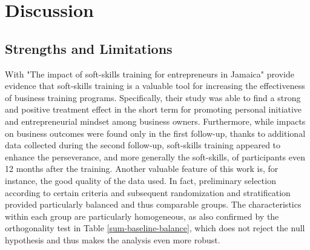 \chapter{Discussion}
\label{sec-4-discussion}

\section{Strengths and Limitations}

With "The impact of soft-skills training for entrepreneurs in Jamaica" \cite{Ubfal2022} provide evidence that soft-skills training is a valuable tool for increasing the effectiveness of business training programs. Specifically, their study was able to find a strong and positive treatment effect in the short term for promoting personal initiative and entrepreneurial mindset among business owners. Furthermore, while impacts on business outcomes were found only in the first follow-up, thanks to additional data collected during the second follow-up, soft-skills training appeared to enhance the perseverance, and more generally the soft-skills, of participants even 12 months after the training. Another valuable feature of this work is, for instance, the good quality of the data used. In fact, preliminary selection according to certain criteria and subsequent randomization and stratification provided particularly balanced and thus comparable groups. The characteristics within each group are particularly homogeneous, as also confirmed by the orthogonality test in Table \ref{sum-baseline-balance}, which does not reject the null hypothesis and thus makes the analysis even more robust.

